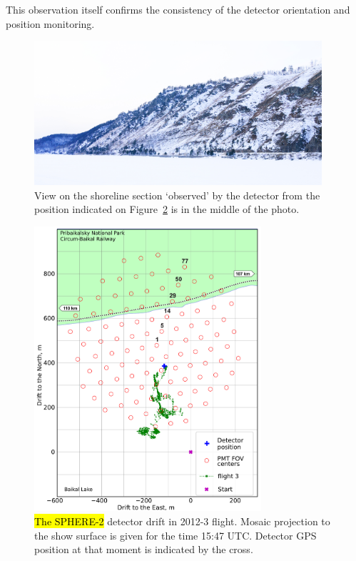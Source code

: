 \documentclass[universe,article,accept,moreauthors,pdftex]{Definitions/mdpi}
\begin{document}
This observation itself confirms the consistency of the detector orientation and position monitoring.

\begin{figure}[H]
        \includegraphics[width=0.95\textwidth]{DSC_7256_1.jpg}
        \caption{View on the shoreline section `observed' by the detector from the position indicated on Figure~\ref{fig:2012-drift} is in the middle of the photo.}
        \label{fig:2012--shore-view}
\end{figure}


\begin{figure}[H]
        \includegraphics[width=0.75\textwidth]{2012_drift-mod.pdf}
        \caption{\hl{The SPHERE-2} detector drift in 2012-3 flight. Mosaic projection to the show surface is given for the time 15:47 UTC. Detector GPS position at that moment is indicated by the cross.}
        \label{fig:2012-drift}%
\end{figure}
\end{document}
